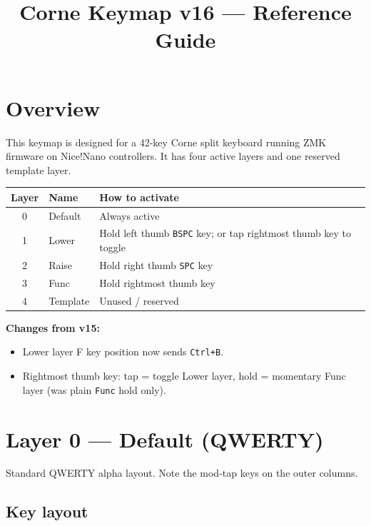 \documentclass[11pt, letterpaper]{article}
\title{\textbf{Corne Keymap v16 — Reference Guide}}
\author{}
\date{}
\begin{document}
\maketitle
\tableofcontents
\newpage

\section{Overview}

This keymap is designed for a 42-key Corne split keyboard running ZMK
firmware on Nice!Nano controllers. It has four active layers and one
reserved template layer.

\begin{center}
\begin{tabular}{cll}
\toprule
\textbf{Layer} & \textbf{Name}    & \textbf{How to activate} \\
\midrule
0              & Default          & Always active \\
1              & Lower            & Hold left thumb \texttt{BSPC} key; or tap rightmost thumb key to toggle \\
2              & Raise            & Hold right thumb \texttt{SPC} key \\
3              & Func             & Hold rightmost thumb key \\
4              & Template         & Unused / reserved \\
\bottomrule
\end{tabular}
\end{center}

\noindent\textbf{Changes from v15:}
\begin{itemize}
  \item Lower layer F key position now sends \texttt{Ctrl+B}.
  \item Rightmost thumb key: tap = toggle Lower layer, hold = momentary Func layer (was plain \texttt{Func} hold only).
\end{itemize}

\section{Layer 0 — Default (QWERTY)}

Standard QWERTY alpha layout. Note the mod-tap keys on the outer columns.

\subsection*{Key layout}
\end{document}
